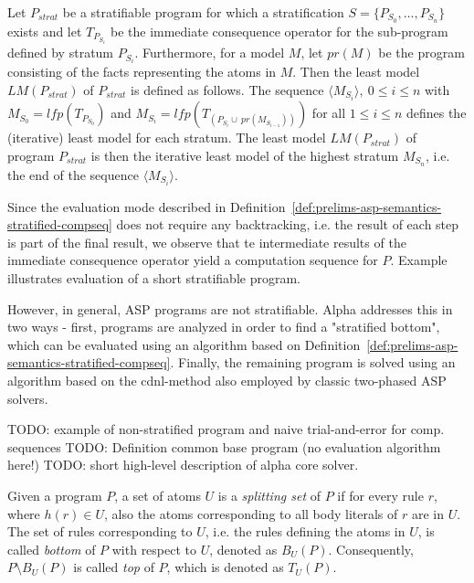 \begin{definition}
\label{def:prelims-asp-semantics-stratified-compseq}
Let $P_{strat}$ be a stratifiable program for which a stratification $S = \{P_{S_0},\ldots,P_{S_n}\}$ exists and let $T_{P_{S_i}}$ be the immediate consequence operator for the sub-program defined by stratum $P_{S_i}$. Furthermore, for a model $M$, let $pr(M)$ be the program consisting of the facts representing the atoms in $M$.
Then the least model $LM(P_{strat})$ of $P_{strat}$ is defined as follows.
The sequence $\langle M_{S_i} \rangle,\ 0 \leq i \leq n$ with $M_{S_0} = \mathit{lfp}(T_{P_{S_0}})$ and $M_{S_i} = \mathit{lfp}(T_{(P_{S_{i}} \cup\ pr(M_{S_{i-1}}))})$ for all $1 \leq i \leq n$ defines the (iterative) least model for each stratum. The least model $LM(P_{strat})$ of program $P_{strat}$ is then the iterative least model of the highest stratum $M_{S_n}$, i.e. the end of the sequence $\langle M_{S_i} \rangle$.
\end{definition}

Since the evaluation mode described in Definition~\ref{def:prelims-asp-semantics-stratified-compseq} does not require any backtracking, i.e. the result of each step is part of the final result, we observe that te intermediate results of the immediate consequence operator yield a computation sequence for $P$. Example~ illustrates evaluation of a short stratifiable program.

However, in general, ASP programs are not stratifiable. Alpha addresses this in two ways - first, programs are analyzed in order to find a "stratified bottom", which can be evaluated using an algorithm based on Definition~\ref{def:prelims-asp-semantics-stratified-compseq}. Finally, the remaining program is solved using an algorithm based on the \gls{cdnl}-method also employed by classic two-phased ASP solvers.

TODO: example of non-stratified program and naive trial-and-error for comp. sequences
TODO: Definition common base program (no evaluation algorithm here!)
TODO: short high-level description of alpha core solver.

\begin{definition}
\label{def:prelims-asp-semantics-splitting-set}
Given a program $P$, a set of atoms $U$ is a \emph{splitting set} of $P$ if for every rule $r$, where $h(r) \in U$, also the atoms corresponding to all body literals of $r$ are in $U$. The set of rules corresponding to $U$, i.e. the rules defining the atoms in $U$, is called \emph{bottom} of $P$ with respect to $U$, denoted as $B_U(P)$. Consequently, $P \setminus B_U(P)$ is called \emph{top} of $P$, which is denoted as $T_U(P)$.\\
\end{definition}

